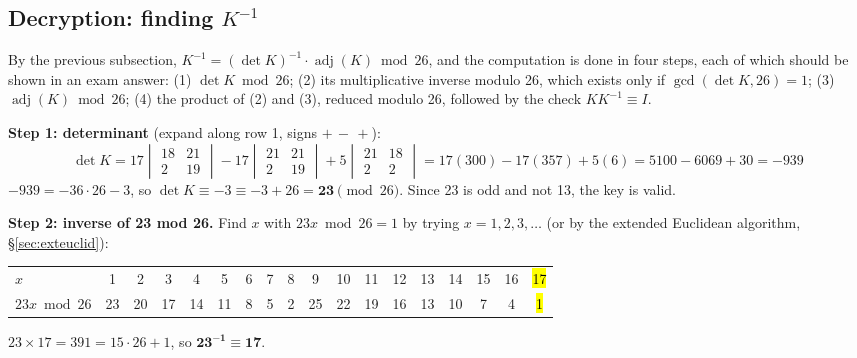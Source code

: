 \subsection{Decryption: finding $K^{-1}$}
By the previous subsection, $K^{-1} = (\det K)^{-1} \cdot \operatorname{adj}(K) \bmod 26$, and the computation is done in four steps, each of which should be shown in an exam answer: (1) $\det K \bmod 26$; (2) its multiplicative inverse modulo 26, which exists only if $\gcd(\det K, 26) = 1$; (3) $\operatorname{adj}(K) \bmod 26$; (4) the product of (2) and (3), reduced modulo 26, followed by the check $KK^{-1} \equiv I$.

\textbf{Step 1: determinant} (expand along row 1, signs $+\,-\,+$):
\[
\det K = 17\begin{vmatrix}18&21\\2&19\end{vmatrix} - 17\begin{vmatrix}21&21\\2&19\end{vmatrix} + 5\begin{vmatrix}21&18\\2&2\end{vmatrix}
= 17(300) - 17(357) + 5(6) = 5100 - 6069 + 30 = -939
\]
$-939 = -36\cdot26 - 3$, so $\det K \equiv -3 \equiv -3 + 26 = \mathbf{23} \pmod{26}$. Since 23 is odd and not 13, the key is valid.

\textbf{Step 2: inverse of 23 mod 26.} Find $x$ with $23x \bmod 26 = 1$ by trying $x = 1, 2, 3, \dots$ (or by the extended Euclidean algorithm, \S\ref{sec:exteuclid}):
\begin{center}\small\setlength{\tabcolsep}{3.2pt}
\begin{tabular}{@{}l*{17}{c}@{}}
\toprule
$x$ & 1&2&3&4&5&6&7&8&9&10&11&12&13&14&15&16&\hl{17}\\
$23x \bmod 26$ & 23&20&17&14&11&8&5&2&25&22&19&16&13&10&7&4&\hl{1}\\
\bottomrule
\end{tabular}
\end{center}
$23 \times 17 = 391 = 15\cdot26 + 1$, so $\mathbf{23^{-1} \equiv 17}$.

